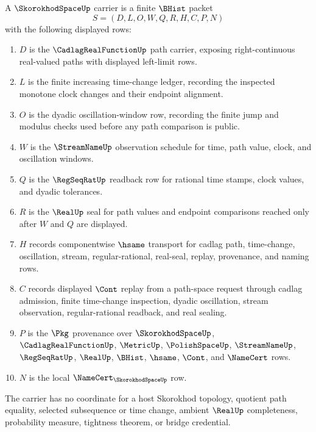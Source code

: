 \begin{definition}
\label{def:skorokhod-space-carrier}
A $\SkorokhodSpaceUp$ carrier is a finite $\BHist$ packet
$$
S=(D,L,O,W,Q,R,H,C,P,N)
$$
with the following displayed rows:
\begin{enumerate}
\item $D$ is the $\CadlagRealFunctionUp$ path carrier, exposing right-continuous real-valued paths with displayed left-limit rows.
\item $L$ is the finite increasing time-change ledger, recording the inspected monotone clock changes and their endpoint alignment.
\item $O$ is the dyadic oscillation-window row, recording the finite jump and modulus checks used before any path comparison is public.
\item $W$ is the $\StreamNameUp$ observation schedule for time, path value, clock, and oscillation windows.
\item $Q$ is the $\RegSeqRatUp$ readback row for rational time stamps, clock values, and dyadic tolerances.
\item $R$ is the $\RealUp$ seal for path values and endpoint comparisons reached only after $W$ and $Q$ are displayed.
\item $H$ records componentwise $\hsame$ transport for cadlag path, time-change, oscillation, stream, regular-rational, real-seal, replay, provenance, and naming rows.
\item $C$ records displayed $\Cont$ replay from a path-space request through cadlag admission, finite time-change inspection, dyadic oscillation, stream observation, regular-rational readback, and real sealing.
\item $P$ is the $\Pkg$ provenance over $\SkorokhodSpaceUp$, $\CadlagRealFunctionUp$, $\MetricUp$, $\PolishSpaceUp$, $\StreamNameUp$, $\RegSeqRatUp$, $\RealUp$, $\BHist$, $\hsame$, $\Cont$, and $\NameCert$ rows.
\item $N$ is the local $\NameCert_{\SkorokhodSpaceUp}$ row.
\end{enumerate}
The carrier has no coordinate for a host Skorokhod topology, quotient path equality, selected subsequence or time change, ambient $\RealUp$ completeness, probability measure, tightness theorem, or bridge credential.
\end{definition}

